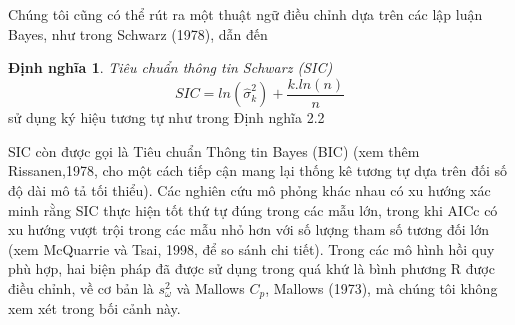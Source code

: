\documentclass[12pt, a4paper,oneside]{book}
\theoremstyle{definition}
\newtheorem{dn}[theo]{Định nghĩa}
\begin{document}
Chúng tôi cũng có thể rút ra một thuật ngữ điều chỉnh dựa trên các lập luận Bayes, như trong Schwarz (1978), dẫn đến
\begin{dn}	
	\textit{Tiêu chuẩn thông tin Schwarz (SIC)} 
	$$SIC= ln (\hat{\sigma}_{k}^{2}) +\dfrac{k.ln(n)}{n}$$
	sử dụng ký hiệu tương tự như trong Định nghĩa 2.2
\end{dn}
SIC còn được gọi là Tiêu chuẩn Thông tin Bayes (BIC) (xem thêm Rissanen,1978, cho một cách tiếp cận mang lại thống kê tương tự dựa trên đối số độ dài mô tả tối thiểu). Các nghiên cứu mô phỏng khác nhau có xu hướng xác minh rằng SIC thực hiện tốt thứ tự đúng trong các mẫu lớn, trong khi AICc có xu hướng vượt trội trong các mẫu nhỏ hơn với số lượng tham số tương đối lớn (xem McQuarrie và Tsai, 1998, để so sánh chi tiết). Trong các mô hình hồi quy phù hợp, hai biện pháp đã được sử dụng trong quá khứ là bình phương R được điều chỉnh, về cơ bản là $ s_{\omega}^2 $ và Mallows $ C_{p} $, Mallows (1973), mà chúng tôi không xem xét trong bối cảnh này.
\end{document}

